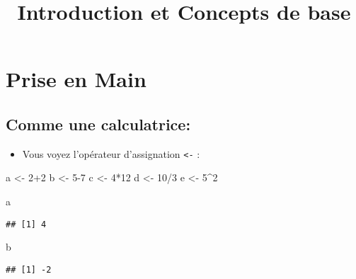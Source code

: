 \documentclass[
]{article}
\title{Introduction et Concepts de base}
\author{}
\date{\vspace{-2.5em}}
\newenvironment{Shaded}{\begin{snugshade}}{\end{snugshade}}
\newcommand{\DecValTok}[1]{\textcolor[rgb]{0.00,0.00,0.81}{#1}}
\newcommand{\NormalTok}[1]{#1}
\newcommand{\OtherTok}[1]{\textcolor[rgb]{0.56,0.35,0.01}{#1}}
\newcommand{\SpecialCharTok}[1]{\textcolor[rgb]{0.00,0.00,0.00}{#1}}
\providecommand{\tightlist}{%
  \setlength{\itemsep}{0pt}\setlength{\parskip}{0pt}}
\begin{document}
\maketitle

\hypertarget{prise-en-main}{%
\section{Prise en Main}\label{prise-en-main}}

\hypertarget{comme-une-calculatrice}{%
\subsection{Comme une calculatrice:}\label{comme-une-calculatrice}}

\begin{itemize}
\tightlist
\item
  Vous voyez l'opérateur d'assignation \texttt{\textless{}-} :
\end{itemize}

\begin{Shaded}
\begin{Highlighting}[]
\NormalTok{a }\OtherTok{\textless{}{-}} \DecValTok{2}\SpecialCharTok{+}\DecValTok{2}
\NormalTok{b }\OtherTok{\textless{}{-}} \DecValTok{5{-}7}
\NormalTok{c }\OtherTok{\textless{}{-}} \DecValTok{4}\SpecialCharTok{*}\DecValTok{12}
\NormalTok{d }\OtherTok{\textless{}{-}} \DecValTok{10}\SpecialCharTok{/}\DecValTok{3}
\NormalTok{e }\OtherTok{\textless{}{-}} \DecValTok{5}\SpecialCharTok{\^{}}\DecValTok{2}
\end{Highlighting}
\end{Shaded}

\begin{Shaded}
\begin{Highlighting}[]
\NormalTok{a}
\end{Highlighting}
\end{Shaded}

\begin{verbatim}
## [1] 4
\end{verbatim}

\begin{Shaded}
\begin{Highlighting}[]
\NormalTok{b}
\end{Highlighting}
\end{Shaded}

\begin{verbatim}
## [1] -2
\end{verbatim}
\end{document}
